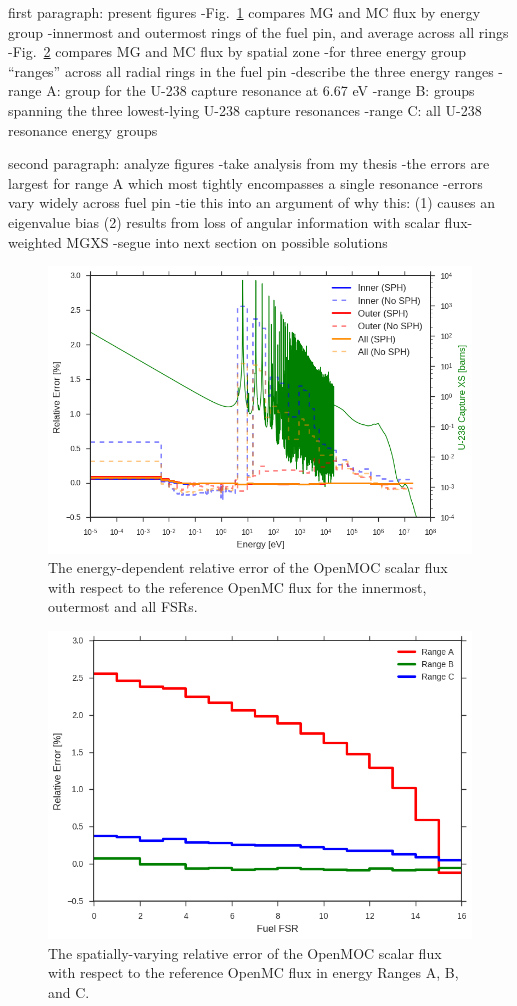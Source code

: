 first paragraph: present figures
-Fig.~\ref{fig:rel-err-energy} compares MG and MC flux by energy group
  -innermost and outermost rings of the fuel pin, and average across all rings
-Fig.~\ref{fig:rel-err-space} compares MG and MC flux by spatial zone
  -for three energy group ``ranges'' across all radial rings in the fuel pin
-describe the three energy ranges
  -range A: group for the U-238 capture resonance at 6.67 eV
  -range B: groups spanning the three lowest-lying U-238 capture resonances
  -range C: all U-238 resonance energy groups
  
second paragraph: analyze figures
-take analysis from my thesis
-the errors are largest for range A which most tightly encompasses a single resonance
-errors vary widely across fuel pin
-tie this into an argument of why this:
  (1) causes an eigenvalue bias
  (2) results from loss of angular information with scalar flux-weighted MGXS
-segue into next section on possible solutions

\begin{figure}[h!]
\centering
\includegraphics[width=\linewidth]{figures/rel-err-inner-outer}
\caption{The energy-dependent relative error of the OpenMOC scalar flux with respect to the reference OpenMC flux for the innermost, outermost and all FSRs.}
\label{fig:rel-err-energy}
\end{figure}

\begin{figure}[H]
\centering
\includegraphics[width=0.8\linewidth]{figures/rel-err-fuel-fsrs}
\caption{The spatially-varying relative error of the OpenMOC scalar flux with respect to the reference OpenMC flux in energy Ranges A, B, and C.}
\label{fig:rel-err-space}
\end{figure}